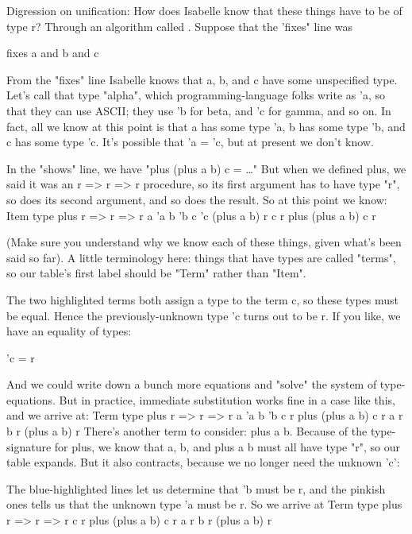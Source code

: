 Digression on unification: How does Isabelle know that these things have to be of type r? Through an algorithm called . Suppose that the 'fixes" line was 
 
fixes a and b and c

From the "fixes" line Isabelle knows that a, b, and c have some unspecified type. Let's call that type "alpha", which programming-language folks write as 'a, so that they can use ASCII; they use 'b for beta, and 'c for gamma, and so on. In fact, all we know at this point is that a has some type 'a, b has some type 'b, and c has some type 'c. It's possible that 'a = 'c, but at present we don't know. 

In the "shows" line, we have "plus (plus a b) c = …" But when we defined plus, we said it was an r => r => r procedure, so its first argument has to have type "r", so does its second argument, and so does the result. So at this point we know:
Item              type
plus                r => r => r
a                  'a
b                  'b
c                  'c
(plus a b)          r
c                   r
plus (plus a b) c   r    

(Make sure you understand why we know each of these things, given what's been said so far). A little terminology here: things that have types are called "terms", so our table's first label should be "Term" rather than "Item". 

The two highlighted terms both assign a type to the term c, so these types must be equal. Hence the previously-unknown type 'c turns out to be r. If you like, we have an equality of types: 


'c = r

And we could write down a bunch more equations and "solve" the system of type-equations. But in practice, immediate substitution works fine in a case like this, and we arrive at:
Term              type
plus                r => r => r
a                  'a
b                  'b
c                   r
plus (plus a b) c   r    
a                   r
b                   r
(plus a b)          r
There's another term to consider: plus a b. Because of the type-signature for plus, we know that a, b, and plus a b must all have type "r", so our table expands. But it also contracts, because we no longer need the unknown 'c':

The blue-highlighted lines let us determine that 'b must be r, and the pinkish ones tells us that the unknown type 'a must be r. So we arrive at 
Term              type
plus                r => r => r
c                   r
plus (plus a b) c   r    
a                   r
b                   r
(plus a b)          r

